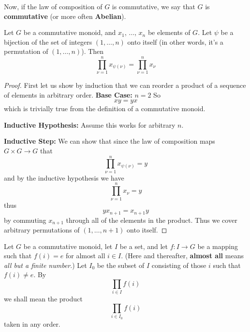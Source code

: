 Now, if the law of composition of $G$ is commutative, we say
that $G$ is \textbf{commutative} (or more often \textbf{Abelian}).

\begin{prop}
Let $G$ be a commutative monoid, and $x_1$, $\ldots$, $x_n$
be elements of $G$. Let $\psi$ be a bijection of the set of
integers $(1,\ldots,n)$ onto itself (in other words, it's a
permutation of $(1,\ldots,n)$). Then
\begin{equation}
\prod^{n}_{\nu=1}x_{\psi(\nu)} = \prod^{n}_{\nu=1}x_{\nu}
\end{equation}
\end{prop}
\begin{proof}
First let us show by induction that we can reorder a product
of a sequence of elements in arbitrary order.
\textbf{Base Case:} $n=2$ So
\begin{equation}
xy = yx
\end{equation}
which is trivially true from the definition of a commutative
monoid.

\textbf{Inductive Hypothesis:} Assume this works for
arbitrary $n$.

\textbf{Inductive Step:} We can show that since the law of
composition maps $G\times G\to G$ that
\begin{equation}
\prod^{n}_{\nu=1}x_{\psi(\nu)} = y
\end{equation}
and by the inductive hypothesis we have
\begin{equation}
\prod^{n}_{\nu=1}x_{\nu} = y
\end{equation}
thus
\begin{equation}
yx_{n+1} = x_{n+1}y
\end{equation}
by commuting $x_{n+1}$ through all of the elements in the
product. Thus we cover arbitrary permutations of
$(1,\ldots,n+1)$ onto itself.
\end{proof}

Let $G$ be a commutative monoid, let $I$ be a set, and let
$f:I\to G$ be a mapping such that $f(i)=e$ for almost all
$i\in I$. (Here and thereafter, \textbf{almost all} 
means \emph{all but a finite number}.) Let $I_{0}$ be the
subset of $I$ consisting of those $i$ such that $f(i)\neq
e$. By
\begin{equation}
\prod_{i\in I}f(i)
\end{equation}
we shall mean the product
\begin{equation}
\prod_{i\in I_{0}}f(i)
\end{equation}
taken in any order. 

